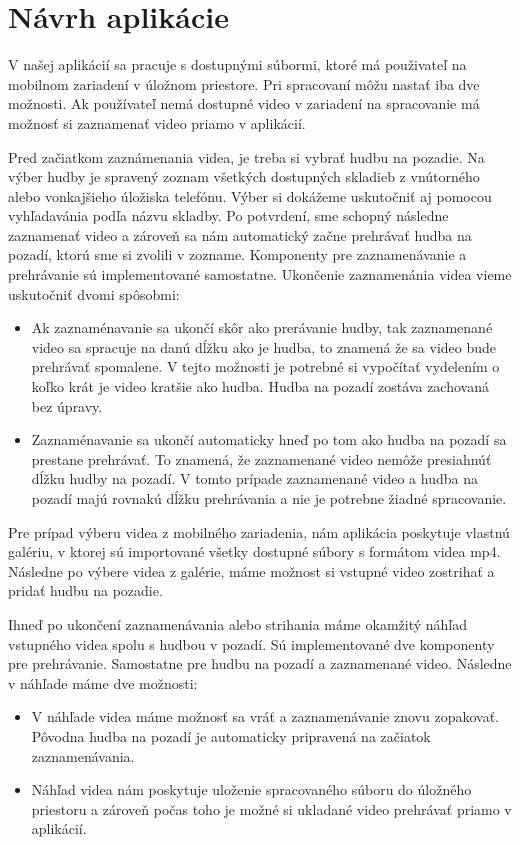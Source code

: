 \documentclass[12pt, oneside]{book}
\begin{document}
\section{Návrh aplikácie}

\hspace{15pt} V našej aplikácií sa pracuje s dostupnými súbormi, ktoré má použivateľ na mobilnom zariadení v úložnom priestore. Pri spracovaní môžu nastať iba dve možnosti. Ak používateľ nemá dostupné video v zariadení na spracovanie má možnosť si zaznamenať video priamo v aplikácií.

\hspace{15pt} Pred začiatkom zaznámenania videa, je treba si vybrať hudbu na pozadie. Na výber hudby je spravený zoznam všetkých dostupných skladieb z vnútorného alebo vonkajšieho úložiska telefónu. Výber si dokážeme uskutočniť aj pomocou vyhľadavánia podľa názvu skladby. Po potvrdení, sme schopný následne zaznamenať video a zároveň sa nám automatický začne prehrávať hudba na pozadí, ktorú sme si zvolili v zozname. Komponenty pre zaznamenávanie a prehrávanie sú implementované samostatne. Ukončenie zaznamenánia videa vieme uskutočniť dvomi spôsobmi: 
\begin{itemize}
    \item Ak zaznaménavanie sa ukončí skôr ako prerávanie hudby, tak zaznamenané video sa spracuje na danú dĺžku ako je hudba, to znamená že sa video bude prehrávať spomalene. V tejto možnosti je potrebné si vypočítať vydelením o koľko krát je video kratšie ako hudba. Hudba na pozadí zostáva zachovaná bez úpravy.
    \item Zaznaménavanie sa ukončí automaticky hneď po tom ako hudba na pozadí sa prestane prehrávať. To znamená, že zaznamenané video nemôže presiahnúť dĺžku hudby na pozadí. V tomto prípade zaznamenané video a hudba na pozadí majú rovnakú dĺžku prehrávania a nie je potrebne žiadné spracovanie.  
\end{itemize}

Pre prípad výberu videa z mobilného zariadenia, nám aplikácia poskytuje vlastnú galériu, v ktorej sú importované všetky dostupné súbory s formátom videa mp4. Následne po výbere videa z galérie, máme možnost si vstupné video zostrihať a pridať hudbu na pozadie.

Ihneď po ukončení zaznamenávania alebo strihania máme okamžitý náhľad vstupného videa spolu s hudbou v pozadí. Sú implementované dve  komponenty pre prehrávanie. Samostatne pre hudbu na pozadí a zaznamenané video. Následne v náhľade máme dve možnosti:
\begin{itemize}
    \item V náhľade videa máme možnosť sa vráť a zaznamenávanie znovu zopakovať. Pôvodna hudba na pozadí je automaticky pripravená na začiatok zaznamenávania.
    \item Náhľad videa nám poskytuje uloženie spracovaného súboru do úložného priestoru a zároveň počas toho je možné si ukladané video prehrávať priamo v aplikácií.
\end{itemize}
\end{document}
